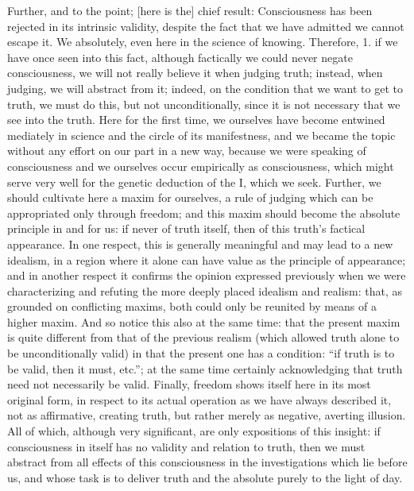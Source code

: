 Further, and to the point;
[here is the] chief result:
Consciousness has been rejected in its intrinsic validity,
despite the fact that we have admitted we cannot escape it.
We absolutely, even here in the science of knowing.
Therefore,
1. if we have once seen into this fact,
although factically we could never negate consciousness,
we will not really believe it when judging truth;
instead, when judging, we will abstract from it;
indeed, on the condition that we want to get to truth,
we must do this, but not unconditionally,
since it is not necessary that we see into the truth.
Here for the first time,
we ourselves have become entwined mediately
in science and the circle of its manifestness,
and we became the topic without any effort on our part
in a new way, because we were speaking of consciousness
and we ourselves occur empirically as consciousness,
which might serve very well for
the genetic deduction of the I, which we seek.
Further, we should cultivate here a maxim for ourselves,
a rule of judging which can be appropriated only through freedom;
and this maxim should become
the absolute principle in and for us:
if never of truth itself,
then of this truth’s factical appearance.
In one respect, this is generally meaningful
and may lead to a new idealism,
in a region where it alone can have value
as the principle of appearance;
and in another respect it confirms
the opinion expressed previously
when we were characterizing and refuting
the more deeply placed idealism and realism:
that, as grounded on conflicting maxims,
both could only be reunited
by means of a higher maxim.
And so notice this also at the same time:
that the present maxim is quite different
from that of the previous realism
(which allowed truth alone to be unconditionally valid)
in that the present one has a condition:
“if truth is to be valid, then it must, etc.”;
at the same time certainly acknowledging that
truth need not necessarily be valid.
Finally, freedom shows itself here
in its most original form,
in respect to its actual operation
as we have always described it,
not as affirmative, creating truth,
but rather merely as negative, averting illusion.
All of which, although very significant,
are only expositions of this insight:
if consciousness in itself has
no validity and relation to truth,
then we must abstract from
all effects of this consciousness in
the investigations which lie before us,
and whose task is to deliver truth
and the absolute purely to the light of day.

